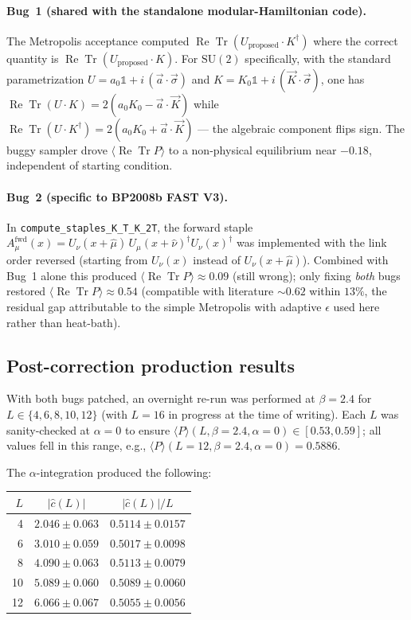 \documentclass[11pt,a4paper]{article}
\theoremstyle{definition}
\newcommand{\Tr}{\operatorname{Tr}}
\renewcommand{\Re}{\operatorname{Re}}
\newcommand{\SUtwo}{\mathrm{SU}(2)}
\begin{document}
\paragraph{Bug~1 (shared with the standalone modular-Hamiltonian
code).} The Metropolis acceptance computed
$\Re\Tr(U_{\text{proposed}} \cdot K^\dagger)$ where the correct
quantity is $\Re\Tr(U_{\text{proposed}} \cdot K)$. For $\SUtwo$
specifically, with the standard parametrization
$U = a_0 \mathbb{1} + i\,(\vec a \cdot \vec \sigma)$ and
$K = K_0 \mathbb{1} + i\,(\vec K \cdot \vec \sigma)$, one has
$\Re\Tr(U\cdot K) = 2(a_0 K_0 - \vec a \cdot \vec K)$ while
$\Re\Tr(U \cdot K^\dagger) = 2(a_0 K_0 + \vec a \cdot \vec K)$ ---
the algebraic component flips sign. The buggy sampler drove
$\langle\Re\Tr P\rangle$ to a non-physical equilibrium near $-0.18$,
independent of starting condition.

\paragraph{Bug~2 (specific to BP2008b FAST V3).} In
\texttt{compute\_staples\_K\_T\_K\_2T}, the forward staple
$A^{\mathrm{fwd}}_\mu(x) = U_\nu(x+\hat\mu)\,U_\mu(x+\hat\nu)^\dagger
U_\nu(x)^\dagger$ was implemented with the link order reversed
(starting from $U_\nu(x)$ instead of $U_\nu(x+\hat\mu)$). Combined
with Bug~1 alone this produced $\langle\Re\Tr P\rangle \approx 0.09$
(still wrong); only fixing \emph{both} bugs restored
$\langle\Re\Tr P\rangle \approx 0.54$ (compatible with literature
$\sim 0.62$ within $13\%$, the residual gap attributable to the
simple Metropolis with adaptive $\epsilon$ used here rather than
heat-bath).

\subsection{Post-correction production results}

With both bugs patched, an overnight re-run was performed at
$\beta = 2.4$ for $L \in \{4, 6, 8, 10, 12\}$ (with $L = 16$ in
progress at the time of writing). Each $L$ was sanity-checked at
$\alpha = 0$ to ensure
$\langle P\rangle(L, \beta = 2.4, \alpha = 0) \in [0.53, 0.59]$;
all values fell in this range, e.g.,
$\langle P\rangle(L=12, \beta=2.4, \alpha=0) = 0.5886$.

The $\alpha$-integration produced the following:

\begin{center}
\begin{tabular}{rcc}
\toprule
$L$ & $|\widehat c(L)|$ & $|\widehat c(L)|/L$ \\
\midrule
4  & $2.046 \pm 0.063$ & $0.5114 \pm 0.0157$ \\
6  & $3.010 \pm 0.059$ & $0.5017 \pm 0.0098$ \\
8  & $4.090 \pm 0.063$ & $0.5113 \pm 0.0079$ \\
10 & $5.089 \pm 0.060$ & $0.5089 \pm 0.0060$ \\
12 & $6.066 \pm 0.067$ & $0.5055 \pm 0.0056$ \\
\bottomrule
\end{tabular}
\end{center}
\end{document}

